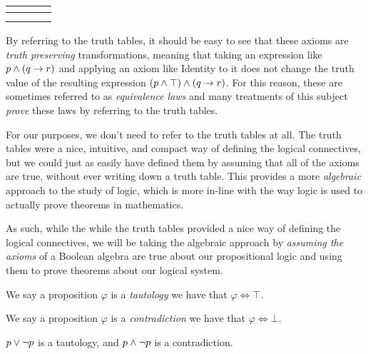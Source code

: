 \begin{definition}
    \begin{table}[H]
        \centering
        \label{tab:heyting}
        \begin{tabular}{|Cc|Cc|} \hline
             \\\hline
               &  \\ \hline
             &  \\ \hline
        \end{tabular}
    \end{table}

    By referring to the truth tables,
    it should be easy to see that these axioms are \emph{truth preserving} transformations,
    meaning that taking an expression like \(p \wedge (q \rightarrow r)\)
    and applying an axiom like Identity to it
    does not change the truth value of the resulting expression \((p \wedge \top) \wedge (q \rightarrow r)\).
    For this reason, these are sometimes referred to as \emph{equivalence laws} and many treatments of this subject
    \emph{prove} these laws by referring to the truth tables.

    For our purposes, we don't need to refer to the truth tables at all.
    The truth tables were a nice, intuitive, and compact way of defining the logical connectives,
    but we could just as easily have defined them by assuming that all of the axioms are true,
    without ever writing down a truth table.
    This provides a more \emph{algebraic} approach to the study of logic,
    which is more in-line with the way logic is used to actually prove theorems in mathematics.

    As such, while the while the truth tables provided a nice way of defining the logical connectives,
    we will be taking the algebraic approach by \emph{assuming the axioms} of a Boolean algebra
    are true about our propositional logic
    and using them to prove theorems about our logical system.
\end{definition}

\begin{definition}[Tautology]
    We say a proposition \(\varphi\) is a \emph{tautology}
    \iffbydefn we have that \(\varphi \iff \top\).
\end{definition}
\begin{definition}[Contradiction]
    We say a proposition \(\varphi\) is a \emph{contradiction}
    \iffbydefn we have that \(\varphi \iff \bot\).
\end{definition}
\begin{example}
    \(p \vee \neg p\) is a tautology, and \(p \wedge \neg p\) is a contradiction.
\end{example}

